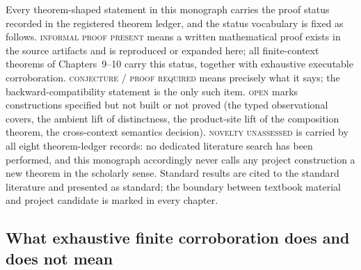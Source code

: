 Every theorem-shaped statement in this monograph carries the proof status
recorded in the registered theorem ledger, and the status vocabulary is
fixed as follows. \textsc{informal proof present} means a written
mathematical proof exists in the source artifacts and is reproduced or
expanded here; all finite-context theorems of Chapters~9--10 carry this
status, together with exhaustive executable corroboration.
\textsc{conjecture} / \textsc{proof required} means precisely what it says;
the backward-compatibility statement is the only such item.
\textsc{open} marks constructions specified but not built or not proved
(the typed observational covers, the ambient lift of distinctness, the
product-site lift of the composition theorem, the cross-context semantics
decision). \textsc{novelty unassessed} is carried by all eight
theorem-ledger records: no dedicated literature search has been performed,
and this monograph accordingly never calls any project construction a new
theorem in the scholarly sense. Standard results are cited to the standard
literature \cite{maclane,johnstone,stacks00ZC,stacks00W1,stacks00WO} and
presented as standard; the boundary between textbook material and project
candidate is marked in every chapter.

\subsection{What exhaustive finite corroboration does and does not
mean}\label{ch01:sec:corroboration}

